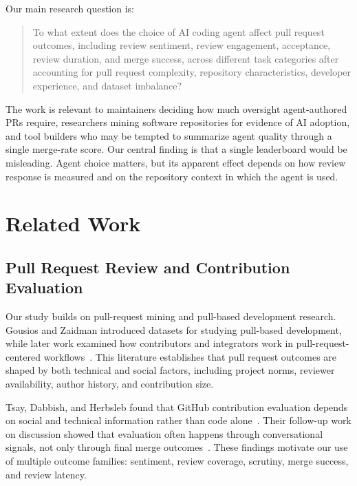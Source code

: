 \documentclass[sigconf,nonacm]{acmart}
\begin{document}
Our main research question is:

\begin{quote}
To what extent does the choice of AI coding agent affect pull request outcomes, including review sentiment, review engagement, acceptance, review duration, and merge success, across different task categories after accounting for pull request complexity, repository characteristics, developer experience, and dataset imbalance?
\end{quote}

The work is relevant to maintainers deciding how much oversight agent-authored PRs require, researchers mining software repositories for evidence of AI adoption, and tool builders who may be tempted to summarize agent quality through a single merge-rate score. Our central finding is that a single leaderboard would be misleading. Agent choice matters, but its apparent effect depends on how review response is measured and on the repository context in which the agent is used.

\section{Related Work}

\subsection{Pull Request Review and Contribution Evaluation}

Our study builds on pull-request mining and pull-based development research. Gousios and Zaidman introduced datasets for studying pull-based development, while later work examined how contributors and integrators work in pull-request-centered workflows~\cite{gousios2014dataset,gousios2014exploratory,gousios2016work}. This literature establishes that pull request outcomes are shaped by both technical and social factors, including project norms, reviewer availability, author history, and contribution size.

Tsay, Dabbish, and Herbsleb found that GitHub contribution evaluation depends on social and technical information rather than code alone~\cite{tsay2014influence}. Their follow-up work on discussion showed that evaluation often happens through conversational signals, not only through final merge outcomes~\cite{tsay2014discussion}. These findings motivate our use of multiple outcome families: sentiment, review coverage, scrutiny, merge success, and review latency.
\end{document}

